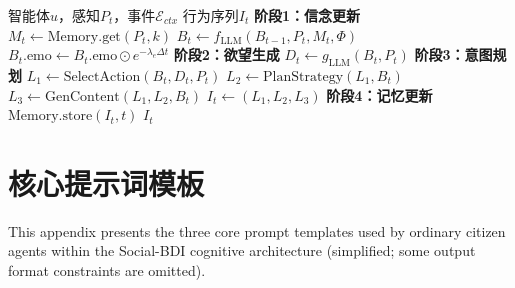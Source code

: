 \documentclass[a4paper,fleqn]{cas-dc}
\begin{document}
\vspace{6pt}
\noindent
\begin{minipage}[t]{\columnwidth}
\begin{algorithm}[H]
\caption{Social-BDI认知决策管线}
\label{alg:Social-BDI}
\begin{algorithmic}[1]
\REQUIRE 智能体$u$，感知$P_t$，事件$\mathcal{E}_{ctx}$
\ENSURE 行为序列$I_t$
\STATE \textbf{阶段1：信念更新}
\STATE $M_t \leftarrow \text{Memory.get}(P_t, k)$
\STATE $B_t \leftarrow f_{\text{LLM}}(B_{t-1}, P_t, M_t, \Phi)$
\STATE $B_t.\text{emo} \leftarrow B_t.\text{emo} \odot e^{-\lambda_e \Delta t}$
\STATE \textbf{阶段2：欲望生成}
\STATE $D_t \leftarrow g_{\text{LLM}}(B_t, P_t)$
\STATE \textbf{阶段3：意图规划}
\STATE $L_1 \leftarrow \text{SelectAction}(B_t, D_t, P_t)$
\STATE $L_2 \leftarrow \text{PlanStrategy}(L_1, B_t)$
\STATE $L_3 \leftarrow \text{GenContent}(L_1, L_2, B_t)$
\STATE $I_t \leftarrow (L_1, L_2, L_3)$
\STATE \textbf{阶段4：记忆更新}
\STATE $\text{Memory.store}(I_t, t)$
\RETURN $I_t$
\end{algorithmic}
\end{algorithm}
\end{minipage}

\section{核心提示词模板}
\label{app:prompts}

This appendix presents the three core prompt templates used by ordinary citizen agents within the Social-BDI cognitive architecture (simplified; some output format constraints are omitted).
\end{document}
